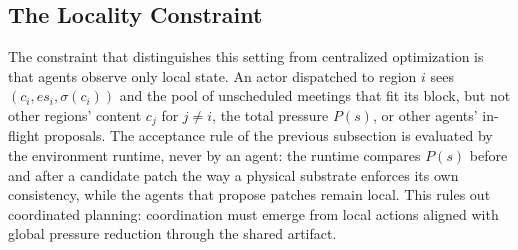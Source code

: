 \subsection{The Locality Constraint}

The constraint that distinguishes this setting from centralized optimization is that agents observe only local state. An actor dispatched to region $i$ sees $(c_i, es_i, \sigma(c_i))$ and the pool of unscheduled meetings that fit its block, but not other regions' content $c_j$ for $j \neq i$, the total pressure $P(s)$, or other agents' in-flight proposals. The acceptance rule of the previous subsection is evaluated by the environment runtime, never by an agent: the runtime compares $P(s)$ before and after a candidate patch the way a physical substrate enforces its own consistency, while the agents that propose patches remain local. This rules out coordinated planning: coordination must emerge from local actions aligned with global pressure reduction through the shared artifact.
